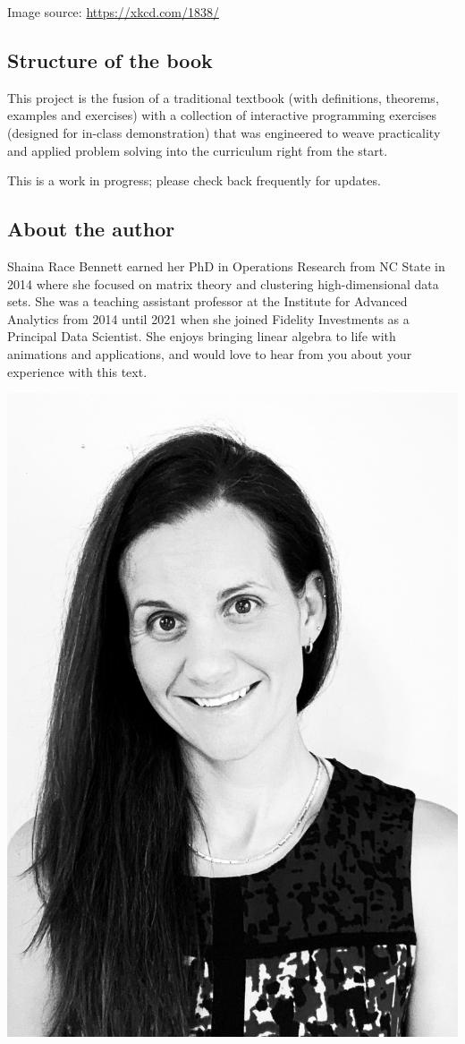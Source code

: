 \documentclass[
]{article}
\theoremstyle{definition}
\theoremstyle{definition}
\theoremstyle{definition}
\theoremstyle{definition}
\theoremstyle{remark}
\begin{document}
Image source: \url{https://xkcd.com/1838/}

\hypertarget{structure-of-the-book}{%
\subsection*{Structure of the book}\label{structure-of-the-book}}

This project is the fusion of a traditional textbook (with definitions, theorems, examples and exercises) with a collection of interactive programming exercises (designed for in-class demonstration) that was engineered to weave practicality and applied problem solving into the curriculum right from the start.

This is a work in progress; please check back frequently for updates.

\hypertarget{about-the-author}{%
\subsection*{About the author}\label{about-the-author}}

Shaina Race Bennett earned her PhD in Operations Research from NC State in 2014 where she focused on matrix theory and clustering high-dimensional data sets. She was a teaching assistant professor at the Institute for Advanced Analytics from 2014 until 2021 when she joined Fidelity Investments as a Principal Data Scientist. She enjoys bringing linear algebra to life with animations and applications, and would love to hear from you about your experience with this text.

\begin{center}\includegraphics[width=0.4\linewidth]{figs/profile} \end{center}
\end{document}
